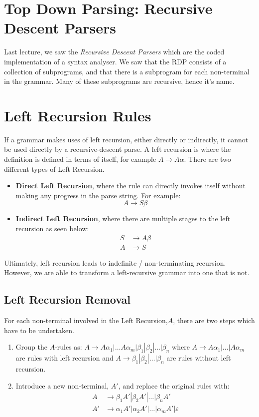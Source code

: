 
\section{Top Down Parsing: Recursive Descent Parsers}
Last lecture, we saw the \textit{Recursive Descent Parsers} which are the coded implementation of a syntax analyser. We saw that the RDP consists of a collection of subprograms, and that there is a subprogram for each non-terminal in the grammar. Many of these subprograms are recursive, hence it's name. 

\section{Left Recursion Rules}
If a grammar makes uses of left recursion, either directly or indirectly, it cannot be used directly by a recursive-descent parse. A left recursion is where the definition is defined in terms of itself, for example $A \rightarrow A \alpha$. There are two different types of Left Recursion.
\begin{itemize}
    \item \textbf{Direct Left Recursion}, where the rule can directly invokes itself without making any progress in the parse string. For example:
    \[ A \rightarrow S \beta \]
    \item \textbf{Indirect Left Recursion}, where there are multiple stages to the left recursion as seen below:
    \begin{align*}
        S & \rightarrow A \beta \\
        A & \rightarrow S
    \end{align*}
\end{itemize}
Ultimately, left recursion leads to indefinite / non-terminating recursion. However, we are able to transform a left-recursive grammar into one that is not.

\subsection{Left Recursion Removal}
For each non-terminal involved in the Left Recursion,$A$, there are two steps which have to be undertaken. 
\begin{enumerate}
    \item Group the $A$-rules as: $A \rightarrow A\alpha_1 | \ldots A \alpha_m | \beta_1 | \beta_2 | \ldots | \beta_n $
    where $A \rightarrow A \alpha_1 | \ldots | A \alpha_m$ are rules with left recursion and $A \rightarrow \beta_1 | \beta_2 | \ldots | \beta_n$ are rules without left recursion.
    \item Introduce a new non-terminal, $A'$, and replace the original rules with:
    \begin{align*}
        A & \rightarrow \beta_1 A' | \beta_2 A' | \ldots | \beta_n A'\\
        A' & \rightarrow \alpha_1 A' | \alpha_2 A' | \ldots | \alpha_m A' | \varepsilon
    \end{align*}
\end{enumerate}

